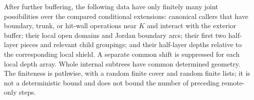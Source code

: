 \begin{proposition}\label{wall:finite-local-patterns}
After further buffering, the following data have only finitely many joint possibilities over the compared conditional extensions: canonical callers that have boundary, trunk, or hit-wall operations near $K$ and interact with the exterior buffer; their local open domains and Jordan boundary arcs; their first two half-layer pieces and relevant child groupings; and their half-layer depths relative to the corresponding local shield.  A separate common shift is suppressed for each local depth array.  Whole internal subtrees have common determined geometry.  The finiteness is pathwise, with a random finite cover and random finite lists; it is not a deterministic bound and does not bound the number of preceding remote-only steps.
\end{proposition}

